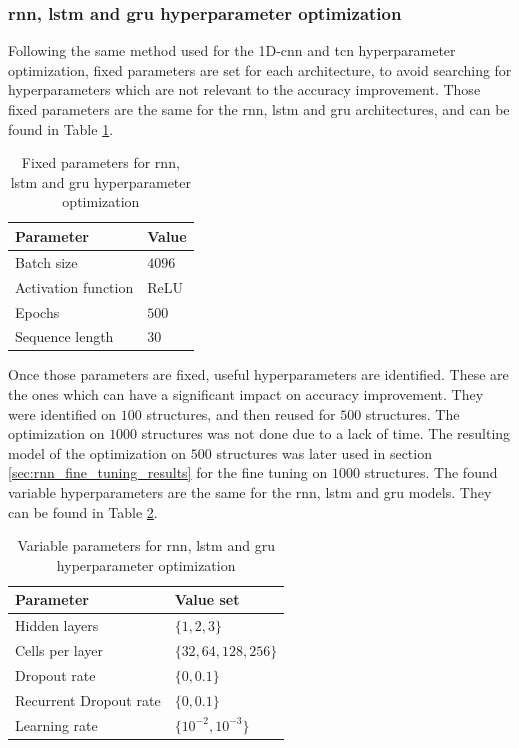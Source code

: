 \documentclass[conference]{IEEEtran}
\begin{document}
\subsubsection{\gls{rnn}, \gls{lstm} and \gls{gru} hyperparameter optimization}
\label{sec:rnn_hyperparameter_optimization}

Following the same method used for the 1D-\gls{cnn} and \gls{tcn} hyperparameter optimization, fixed parameters are set for each architecture, to avoid searching for hyperparameters which are not relevant to the accuracy improvement. Those fixed parameters are the same for the \gls{rnn}, \gls{lstm} and \gls{gru} architectures, and can be found in Table \ref{tab:fixed_parameters_rnn_optimization}.

\begin{table}[htp]
	\centering
	\caption{Fixed parameters for \gls{rnn}, \gls{lstm} and \gls{gru} hyperparameter optimization}
	\label{tab:fixed_parameters_rnn_optimization}
	\begin{tabular}{ll}
		\textbf{Parameter} & \textbf{Value} \\
		\hline
		Batch size & $ 4096 $ \\
		Activation function & ReLU \\
		Epochs & $ 500 $ \\
		Sequence length & $ 30 $ 
	\end{tabular}
\end{table}

Once those parameters are fixed, useful hyperparameters are identified. These are the ones which can have a significant impact on accuracy improvement. They were identified on $ 100 $ structures, and then reused for $ 500 $ structures. The optimization on $ 1000 $ structures was not done due to a lack of time. The resulting model of the optimization on $ 500 $ structures was later used in section \ref{sec:rnn_fine_tuning_results} for the fine tuning on $ 1000 $ structures. The found variable hyperparameters are the same for the \gls{rnn}, \gls{lstm} and \gls{gru} models. They can be found in Table \ref{tab:variable_parameters_rnn_optimization}.

\begin{table}[htp]
	\centering
	\caption{Variable parameters for \gls{rnn}, \gls{lstm} and \gls{gru} hyperparameter optimization}
	\label{tab:variable_parameters_rnn_optimization}
	\begin{tabular}{ll}
		\textbf{Parameter} & \textbf{Value set} \\
		\hline
		Hidden layers & $ \{1, 2, 3\} $ \\
		Cells per layer & $ \{32, 64, 128, 256\} $ \\
		Dropout rate & $ \{0, 0.1\} $ \\
		Recurrent Dropout rate & $ \{0, 0.1\} $ \\
		Learning rate & $ \{10^{-2}, 10^{-3}\} $
	\end{tabular}
\end{table}
\end{document}
